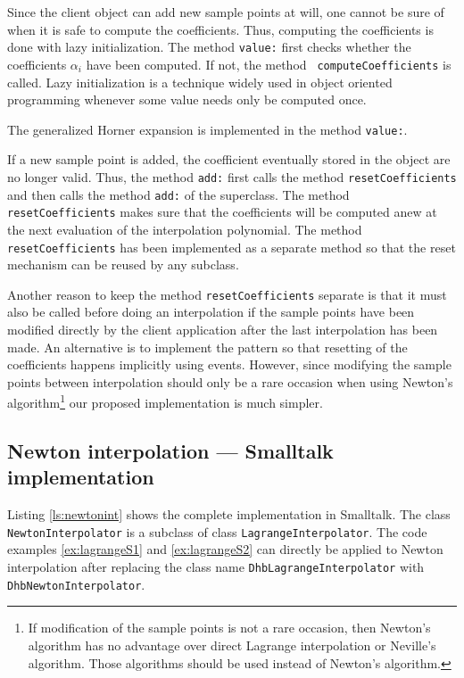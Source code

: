 \documentclass[twoside]{book}
\begin{document}
Since the client object can add new sample points at will, one
cannot be sure of when it is safe to compute the coefficients.
Thus, computing the coefficients is done with lazy initialization.
The method {\tt value:} first checks whether the coefficients
$\alpha_i$ have been computed. If not, the method {\tt
computeCoefficients} is called. Lazy initialization is a technique
widely used in object oriented programming whenever some value
needs only be computed once.

\noindent The generalized Horner expansion is implemented in the
method {\tt value:}.

If a new sample point is added, the coefficient eventually stored
in the object are no longer valid. Thus, the method {\tt add:}
first calls the method {\tt resetCoefficients} and then calls the
method {\tt add:} of the superclass. The method {\tt
resetCoefficients} makes sure that the coefficients will be
computed anew at the next evaluation of the interpolation
polynomial. The method {\tt resetCoefficients} has been
implemented as a separate method so that the reset mechanism can
be reused by any subclass.

Another reason to keep the method {\tt resetCoefficients} separate
is that it must also be called before doing an interpolation if
the sample points have been modified directly by the client
application after the last interpolation has been made. An
alternative is to implement the 
pattern so that resetting of the coefficients happens implicitly
using events. However, since modifying the sample points between
interpolation should only be a rare occasion when using Newton's
algorithm\footnote{If modification of the sample points is not a
rare occasion, then Newton's algorithm has no advantage over
direct Lagrange interpolation or Neville's algorithm. Those
algorithms should be used instead of Newton's algorithm.} our
proposed implementation is much simpler.

\subsection{Newton interpolation --- Smalltalk implementation}
Listing \ref{ls:newtonint} shows the complete implementation in
Smalltalk. The class {\tt NewtonInterpolator} is a subclass of
class {\tt LagrangeInterpolator}. The code examples
\ref{ex:lagrangeS1} and \ref{ex:lagrangeS2} can directly be
applied to Newton interpolation after replacing the class name
{\tt DhbLagrangeInterpolator} with {\tt DhbNewtonInterpolator}.
\end{document}

